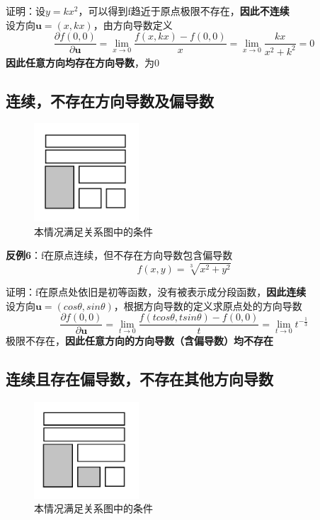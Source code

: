 \documentclass{article}
\begin{document}
\newpage
证明：设$y=kx^2$，可以得到f趋近于原点极限不存在，\textbf{因此不连续}\\
设方向$\mathbf{u}=(x,kx)$，由方向导数定义
\[\frac{\partial f(0,0)}{\partial \mathbf{u}}=  \lim\limits_{x \rightarrow 0} \frac{f(x,kx)-f(0,0)}{x} =  \lim\limits_{x \rightarrow 0} \frac{kx}{x^2+k^2} = 0\]
\textbf{因此任意方向均存在方向导数}，为0


\subsection{连续，不存在方向导数及偏导数}
\begin{figure}[!h]
    \centering
    \includegraphics[width=0.35\textwidth]{pic/07.png}
    \caption{本情况满足关系图中的条件}
\end{figure}

\textbf{反例6}：f在原点连续，但不存在方向导数包含偏导数
\[f(x,y)= \sqrt[3]{x^2+y^2} \]

证明：f在原点处依旧是初等函数，没有被表示成分段函数，\textbf{因此连续}\\
设方向$\mathbf{u}=(cos\theta,sin\theta)$，根据方向导数的定义求原点处的方向导数
\[\frac{\partial f(0,0)}{\partial \mathbf{u}}=  \lim\limits_{t \rightarrow 0} \frac{f(tcos\theta,tsin\theta)-f(0,0)}{t} = \lim\limits_{t \rightarrow 0} t^{-\frac{1}{3}}\]
极限不存在，\textbf{因此任意方向的方向导数（含偏导数）均不存在}

\newpage

\subsection{连续且存在偏导数，不存在其他方向导数}
\begin{figure}[!h]
    \centering
    \includegraphics[width=0.35\textwidth]{pic/08.png}
    \caption{本情况满足关系图中的条件}
\end{figure}
\end{document}
